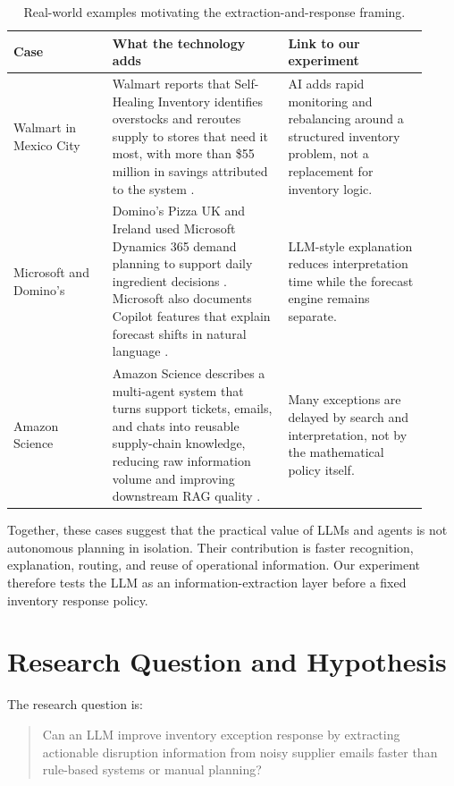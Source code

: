\documentclass[11pt]{article}
\begin{document}
\begin{table}[H]
\centering
\caption{Real-world examples motivating the extraction-and-response framing.}
\label{tab:cases}
\scriptsize
\begin{tabular}{@{}p{0.22\linewidth}p{0.39\linewidth}p{0.31\linewidth}@{}}
\toprule
Case & What the technology adds & Link to our experiment \\
\midrule
Walmart in Mexico City & Walmart reports that Self-Healing Inventory identifies overstocks and reroutes supply to stores that need it most, with more than \$55 million in savings attributed to the system \citep{walmart2025supplychain}. & AI adds rapid monitoring and rebalancing around a structured inventory problem, not a replacement for inventory logic. \\
Microsoft and Domino's & Domino's Pizza UK and Ireland used Microsoft Dynamics 365 demand planning to support daily ingredient decisions \citep{microsoft2023dominos}. Microsoft also documents Copilot features that explain forecast shifts in natural language \citep{microsoft2025copilotdemand}. & LLM-style explanation reduces interpretation time while the forecast engine remains separate. \\
Amazon Science & Amazon Science describes a multi-agent system that turns support tickets, emails, and chats into reusable supply-chain knowledge, reducing raw information volume and improving downstream RAG quality \citep{amazon2025supplyrag}. & Many exceptions are delayed by search and interpretation, not by the mathematical policy itself. \\
\bottomrule
\end{tabular}
\end{table}

Together, these cases suggest that the practical value of LLMs and agents is not autonomous planning in isolation. Their contribution is faster recognition, explanation, routing, and reuse of operational information. Our experiment therefore tests the LLM as an information-extraction layer before a fixed inventory response policy.

\section{Research Question and Hypothesis}

The research question is:

\begin{quote}
Can an LLM improve inventory exception response by extracting actionable disruption information from noisy supplier emails faster than rule-based systems or manual planning?
\end{quote}
\end{document}
